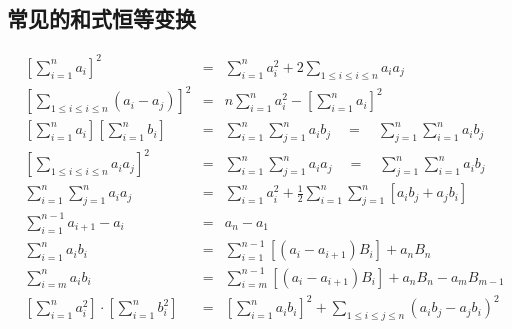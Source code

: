 \documentclass[fontset=windows]{article}
\begin{document}
    \subsection{常见的和式恒等变换}
    \begin{tcolorbox}[colback=blue!5!white,colframe=blue!75!black,title=和式恒等变换]
            \begin{align}
        &\left[
            \sum_{i=1}^{n}{a_i}
            \right]^2
            &=&
            \sum_{i=1}^{n}{a_i^2}
            +
            2\sum_{1 \le i \le i \le n}{a_i a_j}\nonumber\\
        &\left[
            \sum_{1 \le i \le i \le n}{(a_i - a_j)}
            \right]^2
            &=&
            n\sum_{i=1}^{n}{a_i^2}
            -
            \left[
            \sum_{i=1}^{n}{a_i}
            \right]^2\nonumber\\
        &\left[
            \sum_{i=1}^{n}{a_i}
            \right]
            \left[
            \sum_{i=1}^{n}{b_i}
            \right]
            &=&
            \sum_{i=1}^{n}{\sum_{j=1}^{n}{a_i b_j}}
             \quad = \quad
            \sum_{j=1}^{n}{\sum_{i=1}^{n}{a_i b_j}}\nonumber\\
        &\left[
            \sum_{1 \le i \le i \le n}{a_ia_j}
            \right]^2
            &=&
            \sum_{i=1}^{n}{\sum_{j=1}^{n}{a_i a_j}}
            \quad = \quad
            \sum_{j=1}^{n}{\sum_{i=1}^{n}{a_i b_j}}\nonumber\\
        &\sum_{i=1}^{n}{\sum_{j=1}^{n}{a_i a_j}}
            &=&
            \sum_{i=1}^{n}{a_i^2}
            +
            \frac{1}{2}
            \sum_{i=1}^{n}{\sum_{j=1}^{n}{[a_i b_j + a_j b_i]}}\nonumber\\
        &\sum_{i=1}^{n-1}{a_{i+1}-a_i}
            &=&
            a_n-a_1\nonumber\\
        &\sum_{i=1}^{n}{a_ib_i}
            &=&
            \sum_{i=1}^{n-1}{[(a_i-a_{i+1})B_i]}
            +a_nB_n\nonumber\\
        &\sum_{i=m}^{n}{a_ib_i}
            &=&
            \sum_{i=m}^{n-1}{[(a_i-a_{i+1})B_i]}
            +a_nB_n
            -a_mB_{m-1}\nonumber\\
        &\left[
            \sum_{i=1}^{n}{a_i^2}
            \right]
            \cdot 
            \left[
            \sum_{i=1}^{n}{b_i^2}
            \right]
            &=&
            \left[
            \sum_{i=1}^{n}{a_ib_i}
            \right]^2
            +
            \sum_{1\le i \le j \le n}({a_ib_j-a_jb_i})^2\nonumber
    \end{align}
    \end{tcolorbox}
\end{document}

